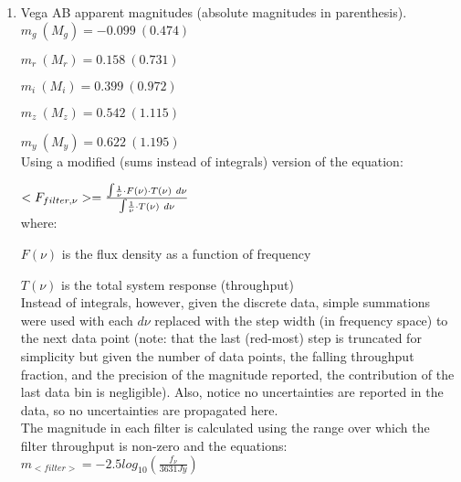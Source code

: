 \documentclass[11pt]{article}
\begin{document}
\begin{enumerate}
\begin{enumerate}
 
	 \item %
	 Vega AB apparent magnitudes (absolute magnitudes in parenthesis).\\
	 
	 \hspace{10mm}$m_{g}\ (M_{g}) = -0.099\ (0.474)$
	 
	 \hspace{10mm}$m_{r}\ (M_{r}) = 0.158\ (0.731)$
	 	  
	 \hspace{10mm}$m_{i}\ (M_{i}) =  0.399\ (0.972)$
	 
	 \hspace{10mm}$m_{z}\ (M_{z}) = 0.542\ (1.115)$
	 
	 \hspace{10mm}$m_{y}\ (M_{y}) = 0.622\ (1.195)$\\
	 	 
	 Using a modified (sums instead of integrals) version of the equation:
		 
		 	\hspace{10mm} $<F_{filter,\nu}> = \frac{\mathlarger{\int} \frac{1}{\nu} \cdot F(\nu) \cdot T(\nu)\ d\nu}{\mathlarger{\int} \frac{1}{\nu} \cdot T(\nu)\ d\nu}$ \\
		 	
		 	where:
		 	
		 	 \hspace {10mm}$F(\nu)$ is the flux density as a function of frequency 
		 	 
		 	 \hspace{10mm} $T(\nu)$ is the total system response (throughput)\\
		 	 
 	 
		Instead of integrals, however, given the discrete data, simple summations were used with each $d\nu$ replaced with the step width (in frequency space) to the next data point (note: that the last (red-most) step is truncated for simplicity but given the number of data points, the falling throughput fraction, and the precision of the magnitude reported, the contribution of the last data bin is negligible). Also, notice no uncertainties are reported in the data, so no uncertainties are propagated here.\\
		
		The magnitude in each filter is calculated using the range over which the filter throughput is non-zero and the equations:\\
			
			 \hspace{10mm} $m_{<filter>} = -2.5 log_{10}(\frac{f_{\nu}}{3631 Jy})$\\
			 

\end{enumerate}
\end{enumerate}
\end{document}
